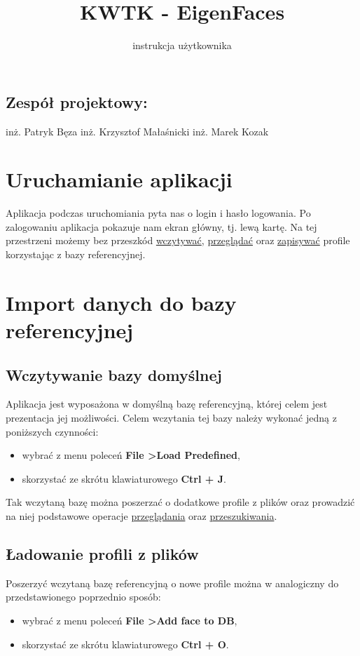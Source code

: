\documentclass[]{article}
\title{KWTK - EigenFaces}
\author{instrukcja użytkownika}
\begin{document}
\maketitle


\subsection*{Zespół projektowy:}
	inż. Patryk Bęza \newline
	inż. Krzysztof Małaśnicki \newline
	inż. Marek Kozak
\newpage


\section[Uruchamianie]{Uruchamianie aplikacji}
\label{sec:run}
Aplikacja podczas uruchomiania pyta nas o login i hasło logowania.
Po zalogowaniu aplikacja pokazuje nam ekran główny, tj. lewą kartę. Na tej przestrzeni możemy bez przeszkód \hyperref[sec:load]{wczytywać}, \hyperref[sec:view]{przeglądać} oraz \hyperref[sec:save]{zapisywać} profile korzystając z bazy referencyjnej.


\section[Ładowanie bazy]{Import danych do bazy referencyjnej}
\label{sec:load}

\subsection{Wczytywanie bazy domyślnej}
Aplikacja jest wyposażona w domyślną bazę referencyjną, której celem jest prezentacja jej możliwości. Celem wczytania tej bazy należy wykonać jedną z poniższych czynności:
\begin{itemize}
\item wybrać z menu poleceń \textbf{File \textgreater \space Load Predefined},
\item skorzystać ze skrótu klawiaturowego \textbf{Ctrl + J}.
\end{itemize}
Tak wczytaną bazę można poszerzać o dodatkowe profile z plików oraz  prowadzić na niej podstawowe operacje \hyperref[sec:view]{przeglądania} oraz \hyperref[sec:query]{przeszukiwania}.

\subsection{Ładowanie profili z plików}
Poszerzyć wczytaną bazę referencyjną o nowe profile można w analogiczny do przedstawionego poprzednio sposób:
\begin{itemize}
	\item wybrać z menu poleceń \textbf{File \textgreater \space Add face to DB},
	\item skorzystać ze skrótu klawiaturowego \textbf{Ctrl + O}.
\end{itemize}
\end{document}
